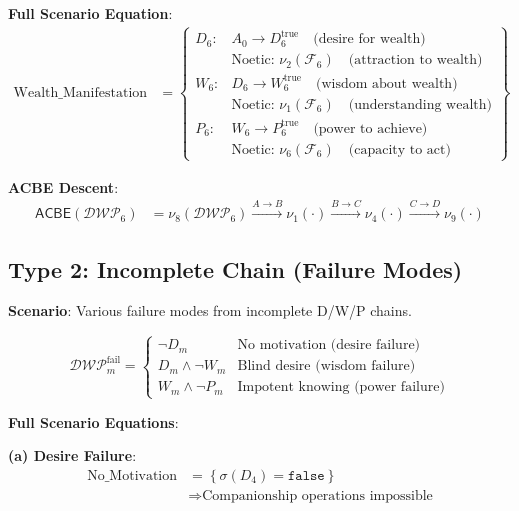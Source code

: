 \documentclass[11pt,twoside]{book}
\newcommand{\noe}[1]{\nu_{#1}}
\newcommand{\Foundations}{\mathcal{F}}
\newcommand{\ACBE}{\mathsf{ACBE}}
\newcommand{\DWP}{\mathcal{DWP}}
\begin{document}
\textbf{Full Scenario Equation}:
\begin{align}
    \text{Wealth\_Manifestation} &= \left\{
    \begin{array}{ll}
        D_6: & A_0 \to D_6^{\mathrm{true}} \quad \text{(desire for wealth)} \\
        & \text{Noetic: } \noe{2}(\Foundations_6) \quad \text{(attraction to wealth)} \\
        W_6: & D_6 \to W_6^{\mathrm{true}} \quad \text{(wisdom about wealth)} \\
        & \text{Noetic: } \noe{1}(\Foundations_6) \quad \text{(understanding wealth)} \\
        P_6: & W_6 \to P_6^{\mathrm{true}} \quad \text{(power to achieve)} \\
        & \text{Noetic: } \noe{6}(\Foundations_6) \quad \text{(capacity to act)}
    \end{array}
    \right\}
\end{align}

\textbf{ACBE Descent}:
\begin{align}
    \ACBE(\DWP_6) &= \noe{8}(\DWP_6) \xrightarrow{A \to B}
    \noe{1}(\cdot) \xrightarrow{B \to C}
    \noe{4}(\cdot) \xrightarrow{C \to D}
    \noe{9}(\cdot)
\end{align}

\subsection{Type 2: Incomplete Chain (Failure Modes)}

\textbf{Scenario}: Various failure modes from incomplete D/W/P chains.

\begin{equation}
\boxed{
    \DWP_m^{\mathrm{fail}} =
    \begin{cases}
        \neg D_m & \text{No motivation (desire failure)} \\
        D_m \land \neg W_m & \text{Blind desire (wisdom failure)} \\
        W_m \land \neg P_m & \text{Impotent knowing (power failure)}
    \end{cases}
}
\end{equation}

\textbf{Full Scenario Equations}:

\textbf{(a) Desire Failure}:
\begin{align}
    \text{No\_Motivation} &= \left\{
    \sigma(D_4) = \mathtt{false}
    \right\} \\
    &\Rightarrow \text{Companionship operations impossible}
\end{align}
\end{document}
